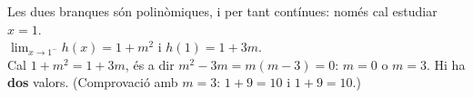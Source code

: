 \begin{apartats}
\begin{nomesllarg}
\begin{solucio}
Les dues branques són polinòmiques, i per tant contínues: només cal estudiar $x=1$.\\
$\lim_{x\to1^-}h(x)=1+m^2$ i $h(1)=1+3m$.\\
Cal $1+m^2=1+3m$, és a dir $m^2-3m=m(m-3)=0$: $\boxed{m=0}$ o $\boxed{m=3}$.
Hi ha \textbf{dos} valors. (Comprovació amb $m=3$: $1+9=10$ i $1+9=10$.)
\end{solucio}
\end{nomesllarg}

\end{apartats}
